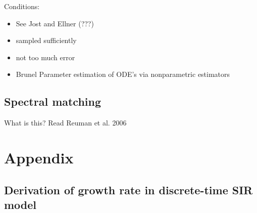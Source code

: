\documentclass{article}
\begin{document}
Conditions:
\begin{itemize}
	\item See Jost and Ellner (???)
	\item sampled sufficiently
	\item not too much error
	\item Brunel Parameter estimation of ODE’s via nonparametric estimators
\end{itemize}



\subsection{Spectral matching}

What is this? Read Reuman et al. 2006




\pagebreak

\section{Appendix}

\subsection{Derivation of growth rate in discrete-time SIR model}
\end{document}
